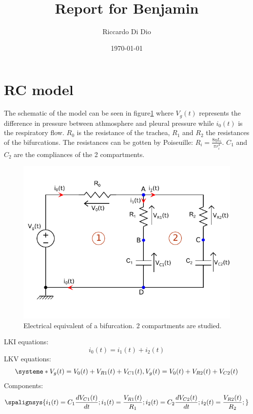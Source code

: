 \documentclass[11pt]{article}
\title{\vspace{-3.0cm}Report for Benjamin}
\author{Riccardo Di Dio}
\date{\today}
\begin{document}
\maketitle
\section{RC model}
The schematic of the model can be seen in figure\ref{fig:LungModelRC}
where $V_g(t)$ represents the difference in pressure between athmosphere and pleural pressure while $i_0(t)$ is the respiratory flow. $R_0$ is the resistance of the trachea, $R_1$ and $R_2$ the resistances of the bifurcations. The resistances can be  gotten by Poiseuille: $R_i = \frac{8\eta L_i}{\pi r_i^4}$. $C_1$ and $C_2$ are the compliances of the 2 compartments.
\begin{figure}[ht]
\label{fig:LungModelRC}
\centering
\includegraphics[scale=1.3]{LungModelRC.pdf}
\caption{Electrical equivalent of a bifurcation. 2 compartments are studied.}
\end{figure}
LKI equations:
\begin{equation}
\label{eq:LKI}
i_0(t) = i_1(t) + i_2(t)
\end{equation}
LKV equations:
\begin{equation}
\label{eq:LKV}
  \systeme*{
  	V_g(t) = V_0(t) + V_{R1}(t) + V_{C1}(t),
	V_g(t) = V_0(t) + V_{R2}(t) + V_{C2}(t)
  }
\end{equation}
Components:
\begin{equation}
\label{eq:components}
  \spalignsys{
  	i_{1}(t) = C_1\frac{dV_{C1}(t)}{dt};
	i_{1}(t) = \frac{V_{R1}(t)}{R_1};
  	i_{2}(t) = C_2\frac{dV_{C2}(t)}{dt};
	i_{2}(t) = \frac{V_{R2}(t)}{R_2};
  }
\end{equation}
\end{document}
